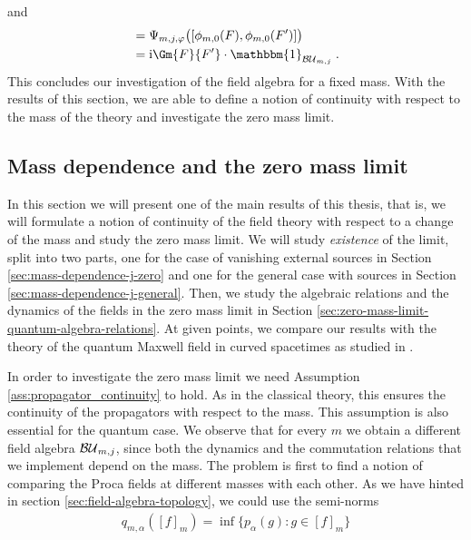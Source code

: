 and
\begin{align}
[\phi_{m,j}(F), \phi_{m,j}(F')]
&= \Psi_{m,j,\varphi} \big([\phi_{m,0}(F), \phi_{m,0}(F')] \big) \notag\\
&= \i \Gm{F}{F'} \cdot \mathbbm{1}_\BUmj \formspace.
\end{align}
This concludes our investigation of the field algebra for a fixed mass. With the results of this section, we are able to define a notion of continuity with respect to the mass of the theory and investigate the zero mass limit.
%
%
%
%
%
%
\subsection{Mass dependence and the zero mass limit}\label{sec:mass_depenence_and_limit}
In this section we will present one of the main results of this thesis, that is, we will formulate a notion of continuity of the field theory with respect to a change of the mass and study the zero mass limit.
We will study \emph{existence} of the limit, split into two parts, one for the case of vanishing external sources in Section \ref{sec:mass-dependence-j-zero} and one for the general case with sources in Section \ref{sec:mass-dependence-j-general}. Then, we study the algebraic relations and the dynamics of the fields in the zero mass limit in Section \ref{sec:zero-mass-limit-quantum-algebra-relations}. At given points, we compare our results with the theory of the quantum Maxwell field in curved spacetimes as studied in \cite{Sanders, pfenning}.\par
In order to investigate the zero mass limit we need Assumption \ref{ass:propagator_continuity} to hold. As in the classical theory, this ensures the continuity of the propagators with respect to the mass. This assumption is also essential for the quantum case.
We observe that for every $m$ we obtain a different field algebra ${\mathcal{BU}_{m,j}}$, since both the dynamics and the commutation relations that we implement depend on the mass. The problem is first to find a notion of comparing the Proca fields at different masses with each other.
%
%
As we have hinted in section \ref{sec:field-algebra-topology}, we could use the semi-norms
\begin{align}
q_{m, \alpha}( [f]_m ) = \inf\big\{ p_\alpha(g) : g \in [f]_m \big\}
\end{align}
